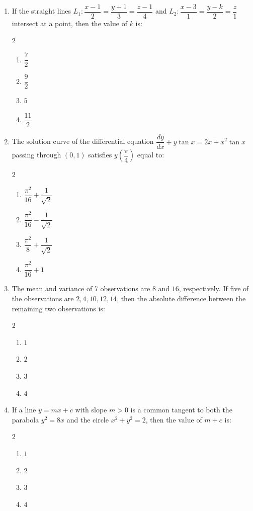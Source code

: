 \documentclass[11pt,a4paper]{article}
\begin{document}
\begin{enumerate}[label=\textbf{\arabic*.},leftmargin=18pt,itemsep=12pt]
  \item If the straight lines $L_1: \dfrac{x - 1}{2} = \dfrac{y + 1}{3} = \dfrac{z - 1}{4}$ and $L_2: \dfrac{x - 3}{1} = \dfrac{y - k}{2} = \dfrac{z}{1}$ intersect at a point, then the value of $k$ is:
  \begin{multicols}{2}
    \begin{enumerate}[label=(\Alph*)]
      \item $\dfrac{7}{2}$
      \item $\dfrac{9}{2}$
      \item $5$
      \item $\dfrac{11}{2}$
    \end{enumerate}
  \end{multicols}

  \item The solution curve of the differential equation $\dfrac{dy}{dx} + y \tan x = 2x + x^2 \tan x$ passing through $(0, 1)$ satisfies $y\left(\dfrac{\pi}{4}\right)$ equal to:
  \begin{multicols}{2}
    \begin{enumerate}[label=(\Alph*)]
      \item $\dfrac{\pi^2}{16} + \dfrac{1}{\sqrt{2}}$
      \item $\dfrac{\pi^2}{16} - \dfrac{1}{\sqrt{2}}$
      \item $\dfrac{\pi^2}{8} + \dfrac{1}{\sqrt{2}}$
      \item $\dfrac{\pi^2}{16} + 1$
    \end{enumerate}
  \end{multicols}

  \item The mean and variance of 7 observations are $8$ and $16$, respectively. If five of the observations are $2, 4, 10, 12, 14$, then the absolute difference between the remaining two observations is:
  \begin{multicols}{2}
    \begin{enumerate}[label=(\Alph*)]
      \item $1$
      \item $2$
      \item $3$
      \item $4$
    \end{enumerate}
  \end{multicols}

  \item If a line $y = mx + c$ with slope $m > 0$ is a common tangent to both the parabola $y^2 = 8x$ and the circle $x^2 + y^2 = 2$, then the value of $m + c$ is:
  \begin{multicols}{2}
    \begin{enumerate}[label=(\Alph*)]
      \item $1$
      \item $2$
      \item $3$
      \item $4$
    \end{enumerate}
  \end{multicols}


\end{enumerate}
\end{document}
